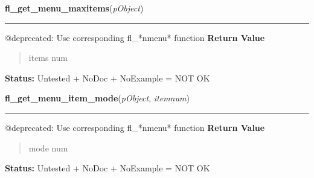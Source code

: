     \vspace{0.5ex}

\hspace{.8\funcindent}\begin{boxedminipage}{\funcwidth}

    \raggedright \textbf{fl\_get\_menu\_maxitems}(\textit{pObject})

    \vspace{-1.5ex}

    \rule{\textwidth}{0.5\fboxrule}
\setlength{\parskip}{2ex}

@deprecated: Use corresponding fl\_*nmenu* function
\setlength{\parskip}{1ex}
      \textbf{Return Value}
    \vspace{-1ex}

      \begin{quote}

items num
      \end{quote}

\textbf{Status:} 
Untested + NoDoc + NoExample = NOT OK


    \end{boxedminipage}

    \label{xformslib:deprecated:fl_get_menu_item_mode}

    \vspace{0.5ex}

\hspace{.8\funcindent}\begin{boxedminipage}{\funcwidth}

    \raggedright \textbf{fl\_get\_menu\_item\_mode}(\textit{pObject}, \textit{itemnum})

    \vspace{-1.5ex}

    \rule{\textwidth}{0.5\fboxrule}
\setlength{\parskip}{2ex}

@deprecated: Use corresponding fl\_*nmenu* function
\setlength{\parskip}{1ex}
      \textbf{Return Value}
    \vspace{-1ex}

      \begin{quote}

mode num
      \end{quote}

\textbf{Status:} 
Untested + NoDoc + NoExample = NOT OK


    \end{boxedminipage}

